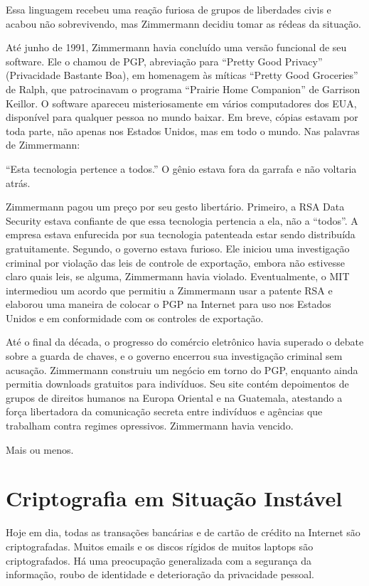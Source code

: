\documentclass{book}
\begin{document}
Essa linguagem recebeu uma reação furiosa de grupos de liberdades civis e acabou não sobrevivendo, mas Zimmermann decidiu tomar as rédeas da situação.

Até junho de 1991, Zimmermann havia concluído uma versão funcional de seu software. Ele o chamou de PGP, abreviação para ``Pretty Good Privacy'' (Privacidade Bastante Boa), em homenagem às míticas ``Pretty Good Groceries'' de Ralph, que patrocinavam o programa ``Prairie Home Companion'' de Garrison Keillor. O software apareceu misteriosamente em vários computadores dos EUA, disponível para qualquer pessoa no mundo baixar. Em breve, cópias estavam por toda parte, não apenas nos Estados Unidos, mas em todo o mundo. Nas palavras de Zimmermann:

``Esta tecnologia pertence a todos.'' O gênio estava fora da garrafa e não voltaria atrás.

Zimmermann pagou um preço por seu gesto libertário. Primeiro, a RSA Data Security estava confiante de que essa tecnologia pertencia a ela, não a ``todos''. A empresa estava enfurecida por sua tecnologia patenteada estar sendo distribuída gratuitamente. Segundo, o governo estava furioso. Ele iniciou uma investigação criminal por violação das leis de controle de exportação, embora não estivesse claro quais leis, se alguma, Zimmermann havia violado. Eventualmente, o MIT intermediou um acordo que permitiu a Zimmermann usar a patente RSA e elaborou uma maneira de colocar o PGP na Internet para uso nos Estados Unidos e em conformidade com os controles de exportação.

Até o final da década, o progresso do comércio eletrônico havia superado o debate sobre a guarda de chaves, e o governo encerrou sua investigação criminal sem acusação. Zimmermann construiu um negócio em torno do PGP, enquanto ainda permitia downloads gratuitos para indivíduos. Seu site contém depoimentos de grupos de direitos humanos na Europa Oriental e na Guatemala, atestando a força libertadora da comunicação secreta entre indivíduos e agências que trabalham contra regimes opressivos. Zimmermann havia vencido.

Mais ou menos.

\section{Criptografia em Situação Instável}
\label{segredos:crip-sit-instavel}

Hoje em dia, todas as transações bancárias e de cartão de crédito na Internet são criptografadas. Muitos emails e os discos rígidos de muitos laptops são criptografados. Há uma preocupação generalizada com a segurança da informação, roubo de identidade e deterioração da privacidade pessoal.
\end{document}
